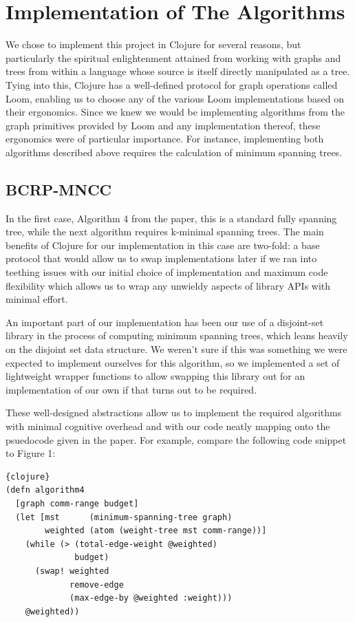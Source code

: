 \documentclass{article}
\begin{document}
\section{Implementation of The Algorithms}
We chose to implement this project in Clojure for several reasons, but particularly the spiritual enlightenment attained from working with graphs and trees from within a language whose source is itself directly manipulated as a tree.
Tying into this, Clojure has a well-defined protocol for graph operations called Loom, enabling us to choose any of the various Loom implementations based on their ergonomics.
Since we knew we would be implementing algorithms from the graph primitives provided by Loom and any implementation thereof, these ergonomics were of particular importance.
For instance, implementing both algorithms described above requires the calculation of minimum spanning trees.
\subsection{BCRP-MNCC}
In the first case, Algorithm 4 from the paper, this is a standard fully spanning tree, while the next algorithm requires k-minimal spanning trees.
The main benefits of Clojure for our implementation in this case are two-fold: a base protocol that would allow us to swap implementations later if we ran into teething issues with our initial choice of implementation and maximum code flexibility which allows us to wrap any unwieldy aspects of library APIs with minimal effort.

An important part of our implementation has been our use of a disjoint-set library in the process of computing minimum spanning trees, which leans heavily on the disjoint set data structure.
We weren't sure if this was something we were expected to implement ourselves for this algorithm, so we implemented a set of lightweight wrapper functions to allow swapping this library out for an implementation of our own if that turns out to be required.

These well-designed abstractions allow us to implement the required algorithms with minimal cognitive overhead and with our code neatly mapping onto the psuedocode given in the paper.
For example, compare the following code snippet to Figure 1:

\begin{lstlisting}{clojure}
(defn algorithm4
  [graph comm-range budget]
  (let [mst      (minimum-spanning-tree graph)
        weighted (atom (weight-tree mst comm-range))]
    (while (> (total-edge-weight @weighted)
              budget)
      (swap! weighted
             remove-edge
             (max-edge-by @weighted :weight)))
    @weighted))
  \end{lstlisting}
\end{document}
